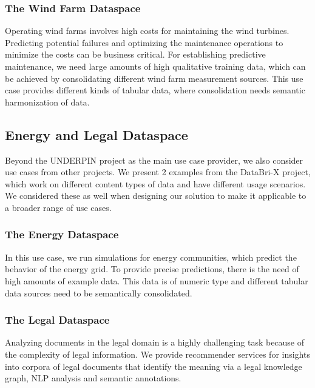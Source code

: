 \documentclass[
  super,
  preprint,
  3p]{elsarticle}
\begin{document}
\subsubsection{The Wind Farm Dataspace}\label{the-wind-farm-dataspace}

Operating wind farms involves high costs for maintaining the wind
turbines. Predicting potential failures and optimizing the maintenance
operations to minimize the costs can be business critical. For
establishing predictive maintenance, we need large amounts of high
qualitative training data, which can be achieved by consolidating
different wind farm measurement sources. This use case provides
different kinds of tabular data, where consolidation needs semantic
harmonization of data.

\subsection{Energy and Legal
Dataspace}\label{energy-and-legal-dataspace}

Beyond the UNDERPIN project as the main use case provider, we also
consider use cases from other projects. We present 2 examples from the
DataBri-X project, which work on different content types of data and
have different usage scenarios. We considered these as well when
designing our solution to make it applicable to a broader range of use
cases.

\subsubsection{The Energy Dataspace}\label{the-energy-dataspace}

In this use case, we run simulations for energy communities, which
predict the behavior of the energy grid. To provide precise predictions,
there is the need of high amounts of example data. This data is of
numeric type and different tabular data sources need to be semantically
consolidated.

\subsubsection{The Legal Dataspace}\label{the-legal-dataspace}

Analyzing documents in the legal domain is a highly challenging task
because of the complexity of legal information. We provide recommender
services for insights into corpora of legal documents that identify the
meaning via a legal knowledge graph, NLP analysis and semantic
annotations.
\end{document}
